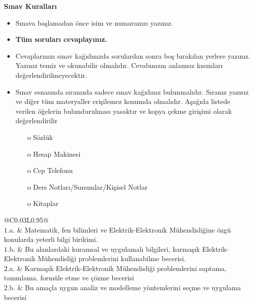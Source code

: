 \documentclass[a4paper, 11pt]{article}
\begin{document}
	\begin{center}
	\large
	\textbf{Sınav Kuralları}
	\end{center}
	\begin{itemize}
		\setlength{\itemsep}{0pt}
		\setlength{\parskip}{1pt}
		\item Sınava başlamadan önce isim ve numaranızı yazınız.
		\item \textbf{Tüm soruları cevaplayınız.} 
		\item Cevaplarınızı sınav kağıdınızda sorulardan sonra boş bırakılan yerlere yazınız. Yazınız temiz ve okunabilir olmalıdır. Cevabınızın anlamsız kısımları değerlendirilmeyecektir.
		\item Sınav esnasında sıranızda sadece sınav kağıdınız bulunmalıdır. Sıranız yazısız ve diğer tüm materyaller erişilemez konumda olmalıdır. Aşağıda listede verilen öğelerin bulundurulması yasaktır ve kopya çekme girişimi olarak değerlendirilir
		\begin{itemize}
			\setlength{\itemsep}{0pt}
			\setlength{\parskip}{1pt}
			\item[o] Sözlük
			\item[o] Hesap Makinesi
			\item[o] Cep Telefonu
			\item[o] Ders Notları/Sunumlar/Kişisel Notlar
			\item[o] Kitaplar
		\end{itemize}
	\end{itemize}
	
	\begin{table}[hb!]
		\centering
		\begin{tabular}{@{}C{0.03\linewidth}L{0.95\linewidth}@{}}
			\toprule
			 \\
			\midrule
			$1$.a. & Matematik, fen bilimleri ve Elektrik-Elektronik Mühendisliğine özgü konularda yeterli bilgi birikimi. \\
			$1$.b. & Bu alanlardaki kuramsal ve uygulamalı bilgileri, karmaşık Elektrik-Elektronik Mühendisliği problemlerini kullanabilme becerisi. \\
			\midrule
			$2$.a. & Karmaşık Elektrik-Elektronik Mühendisliği problemlerini saptama, tanımlama, formüle etme ve çözme becerisi \\
			$2$.b. & Bu amaçla uygun analiz ve modelleme yöntemlerini seçme ve uygulama becerisi \\
			\bottomrule
		\end{tabular}
	\end{table}
	\unboldmath
\end{document}
